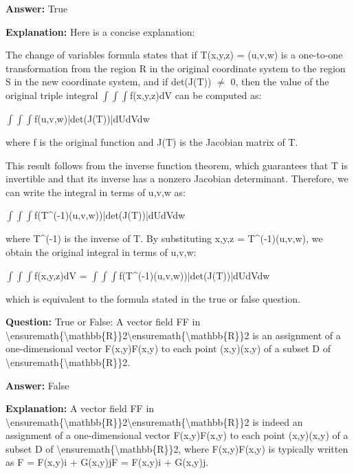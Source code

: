 \documentclass{article}
\begin{document}
                \textbf{Answer:} True

                \textbf{Explanation:} Here is a concise explanation:

The change of variables formula states that if T(x,y,z) = (u,v,w) is a one-to-one transformation from the region R in the original coordinate system to the region S in the new coordinate system, and if det(J(T)) \ensuremath{\neq} 0, then the value of the original triple integral \ensuremath{\int}\ensuremath{\int}\ensuremath{\int}f(x,y,z)dV can be computed as:

\ensuremath{\int}\ensuremath{\int}\ensuremath{\int}f(u,v,w)|det(J(T))|dUdVdw

where f is the original function and J(T) is the Jacobian matrix of T. 

This result follows from the inverse function theorem, which guarantees that T is invertible and that its inverse has a nonzero Jacobian determinant. Therefore, we can write the integral in terms of u,v,w as:

\ensuremath{\int}\ensuremath{\int}\ensuremath{\int}f(T{\textasciicircum}(-1)(u,v,w))|det(J(T))|dUdVdw

where T{\textasciicircum}(-1) is the inverse of T. By substituting x,y,z = T{\textasciicircum}(-1)(u,v,w), we obtain the original integral in terms of u,v,w:

\ensuremath{\int}\ensuremath{\int}\ensuremath{\int}f(x,y,z)dV = \ensuremath{\int}\ensuremath{\int}\ensuremath{\int}f(T{\textasciicircum}(-1)(u,v,w))|det(J(T))|dUdVdw

which is equivalent to the formula stated in the true or false question.
                
                \vspace{0.5cm} 
        
            
                \textbf {Question:} True or False: A vector field FF in {\textbackslash}ensuremath\{{\textbackslash}mathbb\{R\}\}2{\textbackslash}ensuremath\{{\textbackslash}mathbb\{R\}\}2 is an assignment of a one-dimensional vector F(x,y)F(x,y) to each point (x,y)(x,y) of a subset D of {\textbackslash}ensuremath\{{\textbackslash}mathbb\{R\}\}2.
                
                \textbf{Answer:} False

                \textbf{Explanation:} A vector field FF in {\textbackslash}ensuremath\{{\textbackslash}mathbb\{R\}\}2{\textbackslash}ensuremath\{{\textbackslash}mathbb\{R\}\}2 is indeed an assignment of a one-dimensional vector F(x,y)F(x,y) to each point (x,y)(x,y) of a subset D of {\textbackslash}ensuremath\{{\textbackslash}mathbb\{R\}\}2, where F(x,y)F(x,y) is typically written as F = F(x,y)i + G(x,y)jF = F(x,y)i + G(x,y)j.
\end{document}
